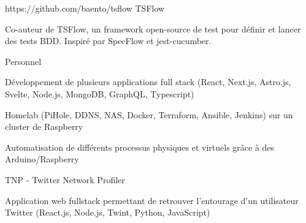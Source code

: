 
\begin{cventries}
  \cventry
    {https://github.com/baento/tsflow} %
    {TSFlow} %
    {} %
    {} %
    {
      \begin{cvitems} %
        \item {Co-auteur de TSFlow, un framework open-source de test pour définir et lancer des tests BDD. Inspiré par SpecFlow et jest-cucumber.}
      \end{cvitems}
    }

  \cventry
    {} %
    {Personnel} %
    {} %
    {} %
    {
      \begin{cvitems} %
        \item {Développement de plusieurs applications full stack (React, Next.js, Astro.js, Svelte, Node.js, MongoDB, GraphQL, Typescript)}
        \item {Homelab (PiHole, DDNS, NAS, Docker, Terraform, Ansible, Jenkins) sur un cluster de Raspberry}
		\item {Automatisation de différents processus physiques et virtuels grâce à des Arduino/Raspberry}
      \end{cvitems}
    }

  \cventry
    {} %
    {TNP - Twitter Network Profiler} %
    {} %
    {} %
    {
      \vspace{-4.0mm}
      \begin{cvitems} %
      	\item {Application web fullstack permettant de retrouver l'entourage d'un utilisateur Twitter (React.js, Node.js, Twint, Python, JavaScript)}
      \end{cvitems}
    }
\end{cventries}